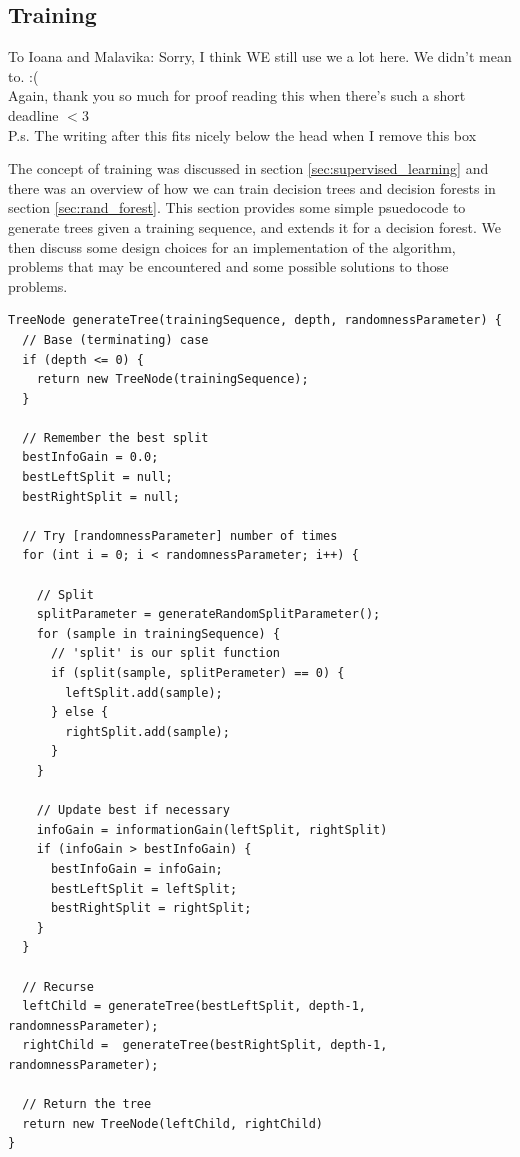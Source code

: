 \documentclass[12pt,twoside,notitlepage]{report}
\begin{document}
      \subsection{Training} \label{sec:training}
          \begin{framed}
              To Ioana and Malavika: Sorry, I think WE still use we a lot here. We didn't mean to. :( \\
              Again, thank you so much for proof reading this when there's such a short deadline $<$3 \\
              P.s. The writing after this fits nicely below the head when I remove this box
          \end{framed}

          The concept of training was discussed in section \ref{sec:supervised_learning} and there was an overview of 
          how we can train decision trees and decision forests in section \ref{sec:rand_forest}. This section provides 
          some simple psuedocode to generate trees given a training sequence, and extends it for a decision forest. We 
          then discuss some design choices for an implementation of the algorithm, problems that may be encountered and 
          some possible solutions to those problems.

          \begin{lstlisting}[float=tp,caption={Psuedocode to train a decision tree.}, label={lst:generateTree}]
TreeNode generateTree(trainingSequence, depth, randomnessParameter) {
  // Base (terminating) case
  if (depth <= 0) {
    return new TreeNode(trainingSequence);
  }

  // Remember the best split
  bestInfoGain = 0.0;
  bestLeftSplit = null;
  bestRightSplit = null;

  // Try [randomnessParameter] number of times
  for (int i = 0; i < randomnessParameter; i++) {
    
    // Split
    splitParameter = generateRandomSplitParameter();
    for (sample in trainingSequence) {
      // 'split' is our split function
      if (split(sample, splitPerameter) == 0) {
        leftSplit.add(sample);
      } else {
        rightSplit.add(sample);
      }
    }

    // Update best if necessary
    infoGain = informationGain(leftSplit, rightSplit)
    if (infoGain > bestInfoGain) {
      bestInfoGain = infoGain;
      bestLeftSplit = leftSplit;
      bestRightSplit = rightSplit;
    }
  }

  // Recurse
  leftChild = generateTree(bestLeftSplit, depth-1, randomnessParameter);
  rightChild =  generateTree(bestRightSplit, depth-1, randomnessParameter);

  // Return the tree
  return new TreeNode(leftChild, rightChild)
}
          \end{lstlisting}
\end{document}
